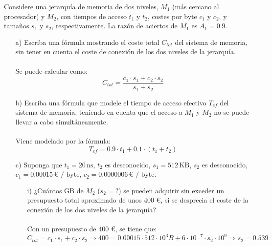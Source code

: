 \begin{ejercicio}
    Considere una jerarquía de memoria de dos niveles, \( M_1 \) (más cercano al procesador) y \( M_2 \), con tiempos de acceso \( t_1 \) y \( t_2 \), costes por byte \( c_1 \) y \( c_2 \), y tamaños \( s_1 \) y \( s_2 \), respectivamente. La razón de aciertos de \( M_1 \) es \( A_1 = 0.9 \).
    \begin{itemize}
        \item[a)] Escriba una fórmula mostrando el coste total \( C_{tot} \) del sistema de memoria, sin tener en cuenta el coste de conexión de los dos niveles de la jerarquía.
            \\ \\
            Se puede calcular como:
            \begin{equation*}
                C_{tot} = \frac{c_1 \cdot s_1 + c_2 \cdot s_2}{s_1 + s_2}
            \end{equation*}
        \item[b)] Escriba una fórmula que modele el tiempo de acceso efectivo \( T_{ef} \) del sistema de memoria, teniendo en cuenta que el acceso a \( M_1 \) y \( M_2 \) no se puede llevar a cabo simultáneamente.
            \\ \\
            Viene modelado por la fórmula:
            \begin{equation*}
                T_{ef} = 0.9 \cdot t_1 + 0.1 \cdot (t_1 + t_2)
            \end{equation*}
        \item[c)] Suponga que \( t_1 = 20 \, \text{ns} \), \( t_2 \) es desconocido, \( s_1 = 512 \, \text{KB} \), \( s_2 \) es desconocido, \( c_1 = 0.00015 \, \text{€ / byte} \), \( c_2 = 0.0000006 \, \text{€ / byte} \).
        \begin{itemize}
            \item[i)] ¿Cuántos GB de \( M_2 \) (\( s_2 = ? \)) se pueden adquirir sin exceder un presupuesto total aproximado de unos 400 €, si se desprecia el coste de la conexión de los dos niveles de la jerarquía?
                \\ \\
                Con un presupuesto de 400 €, se tiene que:
                \begin{equation*}
                    C_{tot} = c_1 \cdot s_1 + c_2 \cdot s_2 \Rightarrow 400 = 0.00015 \cdot 512 \cdot 10^3 B+ 6 \cdot 10^{-7}\cdot s_2 \cdot 10^9 \Rightarrow s_2 = 0.539
                \end{equation*}

\end{itemize}
\end{itemize}
\end{ejercicio}
